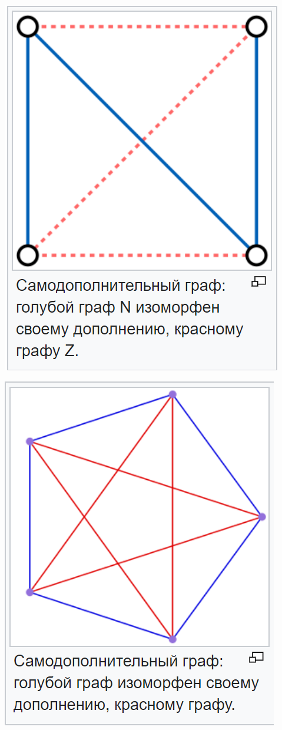 \documentclass[a4paper,14pt]{article} %
\begin{document}
\begin{center}
\includegraphics[scale = 0.8]{pictures/week 4/4.1.png}
\end{center}

\begin{center}
\includegraphics[scale = 0.8]{pictures/week 4/4.2.png}
\end{center}
\end{document}
